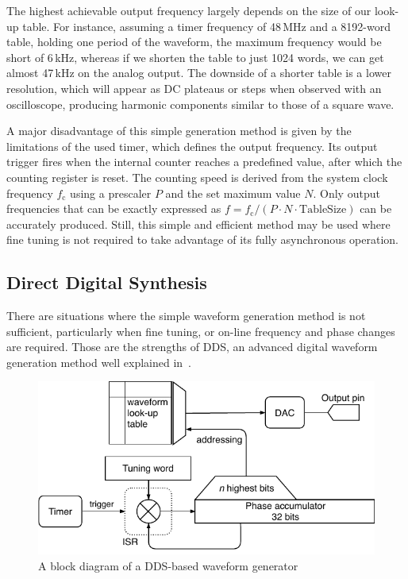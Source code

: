 The highest achievable output frequency largely depends on the size of our look-up table. For instance, assuming a timer frequency of 48\,MHz and a 8192-word table, holding one period of the waveform, the maximum frequency would be short of 6\,kHz, whereas if we shorten the table to just 1024 words, we can get almost 47\,kHz on the analog output. The downside of a shorter table is a lower resolution, which will appear as \gls{DC} plateaus or steps when observed with an oscilloscope, producing harmonic components similar to those of a square wave.

A major disadvantage of this simple generation method is given by the limitations of the used timer, which defines the output frequency. Its output trigger fires when the internal counter reaches a predefined value, after which the counting register is reset. The counting speed is derived from the system clock frequency $f_\mathrm{c}$ using a prescaler $P$ and the set maximum value $N$. Only output frequencies that can be exactly expressed as $f=f_\mathrm{c}/(P\cdot N \cdot \mathrm{TableSize})$ can be accurately produced. Still, this simple and efficient method may be used where fine tuning is not required to take advantage of its fully asynchronous operation.

\subsection{Direct Digital Synthesis} \label{sec:theory_dac_dds}

There are situations where the simple waveform generation method is not sufficient, particularly when fine tuning, or on-line frequency and phase changes are required. Those are the strengths of \gls{DDS}, an advanced digital waveform generation method well explained in~\cite{all-about-dds}.

\begin{figure}[h]
	\centering
	\includegraphics[scale=1] {img/wavegen-dds.pdf}
	\caption{\label{fig:wavegen_dds}A block diagram of a DDS-based waveform generator}
\end{figure}

